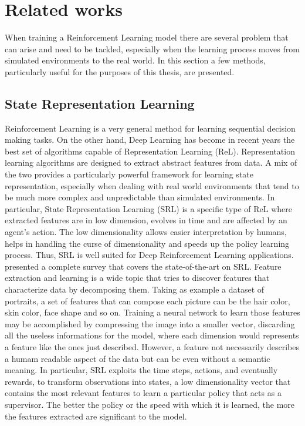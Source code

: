 \chapter{Related works}

When training a Reinforcement Learning model there are several problem that can arise and need to be tackled, especially when the learning process moves from simulated environments to the real world. In this section a few methods, particularly useful for the purposes of this thesis, are presented.

\section{State Representation Learning} \label{sec:srl}

Reinforcement Learning is a very general method for learning sequential decision making tasks. On the other hand, Deep Learning has become in recent years the best set of algorithms capable of Representation Learning (ReL). Representation learning algorithms are designed to extract abstract features from data. A mix of the two provides a particularly powerful framework for learning state representation, especially when dealing with real world environments that tend to be much more complex and unpredictable than simulated environments. In particular, State Representation Learning (SRL) is a specific type of ReL where extracted features are in low dimension, evolves in time and are affected by an agent's action. The low dimensionality allows easier interpretation by humans, helps in handling the curse of dimensionality and speeds up the policy learning process. Thus, SRL is well suited for Deep Reinforcement Learning applications. \citet{DBLP:journals/corr/abs-1802-04181} presented a complete survey that covers the state-of-the-art on SRL. Feature extraction and learning is a wide topic that tries to discover features that characterize data by decomposing them. Taking as example a dataset of portraits, a set of features that can compose each picture can be the hair color, skin color, face shape and so on. Training a neural network to learn those features may be accomplished by compressing the image into a smaller vector, discarding all the useless informations for the model, where each dimension would represents a feature like the ones just described. However, a feature not necessarily describes a humam readable aspect of the data but can be even without a semantic meaning. In particular, SRL exploits the time steps, actions, and eventually rewards, to transform observations into states, a low dimensionality vector that contains the most relevant features to learn a particular policy that acts as a supervisor. The better the policy or the speed with which it is learned, the more the features extracted are significant to the model.

